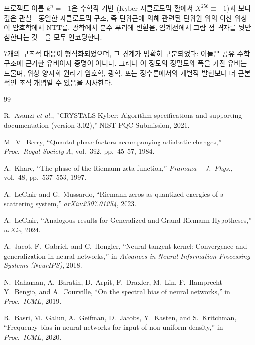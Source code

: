 \documentclass[11pt, a4paper]{article}
\theoremstyle{definition}
\theoremstyle{plain}
\begin{document}
프로젝트 이름 $k^n = -1$은 수학적 기반 (Kyber 시클로토믹 환에서 $X^{256} \equiv -1$)과 보다 깊은 관찰---동일한 시클로토믹 구조, 즉 단위근에 의해 관련된 단위원 위의 이산 위상이 암호학에서 NTT를, 광학에서 분수 푸리에 변환을, 임계선에서 그람 점 격자를 뒷받침한다는 것---을 모두 인코딩한다.

7개의 구조적 대응이 형식화되었으며, 그 경계가 명확히 구분되었다: 이들은 공유 수학 구조에 근거한 유비이지 증명이 아니다. 그러나 이 정도의 정밀도와 폭을 가진 유비는 드물며, 위상 양자화 원리가 암호학, 광학, 또는 정수론에서의 개별적 발현보다 더 근본적인 조직 개념일 수 있음을 시사한다.


\begin{thebibliography}{99}

R.~Avanzi \textit{et al.},
``CRYSTALS-Kyber: Algorithm specifications and supporting documentation
(version 3.02),'' NIST PQC Submission, 2021.

M.~V.~Berry,
``Quantal phase factors accompanying adiabatic changes,''
\textit{Proc.\ Royal Society A}, vol.~392, pp.~45--57, 1984.

A.~Khare,
``The phase of the Riemann zeta function,''
\textit{Pramana -- J.\ Phys.}, vol.~48, pp.~537--553, 1997.

A.~LeClair and G.~Mussardo,
``Riemann zeros as quantized energies of a scattering system,''
\textit{arXiv:2307.01254}, 2023.

A.~LeClair,
``Analogous results for Generalized and Grand Riemann Hypotheses,''
\textit{arXiv}, 2024.

A.~Jacot, F.~Gabriel, and C.~Hongler,
``Neural tangent kernel: Convergence and generalization in neural networks,''
in \textit{Advances in Neural Information Processing Systems (NeurIPS)}, 2018.

N.~Rahaman, A.~Baratin, D.~Arpit, F.~Draxler, M.~Lin, F.~Hamprecht,
Y.~Bengio, and A.~Courville,
``On the spectral bias of neural networks,''
in \textit{Proc.\ ICML}, 2019.

R.~Basri, M.~Galun, A.~Geifman, D.~Jacobs, Y.~Kasten, and S.~Kritchman,
``Frequency bias in neural networks for input of non-uniform density,''
in \textit{Proc.\ ICML}, 2020.


\end{thebibliography}
\end{document}
